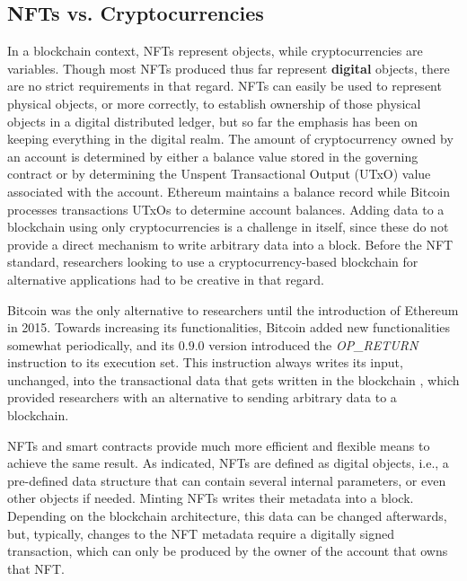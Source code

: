\documentclass[../3_VotingAndNFTs.tex]{subfiles}
\begin{document}
\subsection{NFTs vs. Cryptocurrencies}
In a blockchain context, NFTs represent objects, while cryptocurrencies are variables. Though most NFTs produced thus far represent \textbf{digital} objects, there are no strict requirements in that regard. NFTs can easily be used to represent physical objects, or more correctly, to establish ownership of those physical objects in a digital distributed ledger, but so far the emphasis has been on keeping everything in the digital realm. The amount of cryptocurrency owned by an account is determined by either a balance value stored in the governing contract or by determining the Unspent Transactional Output (UTxO) value associated with the account. Ethereum maintains a balance record while Bitcoin processes transactions UTxOs to determine account balances. Adding data to a blockchain using only cryptocurrencies is a challenge in itself, since these do not provide a direct mechanism to write arbitrary data into a block. Before the NFT standard, researchers looking to use a cryptocurrency-based blockchain for alternative applications had to be creative in that regard.
\par
Bitcoin was the only alternative to researchers until the introduction of Ethereum in 2015. Towards increasing its functionalities, Bitcoin added new functionalities somewhat periodically, and its $0.9.0$ version introduced the \textit{OP\_RETURN} instruction to its execution set. This instruction always writes its input, unchanged, into the transactional data that gets written in the blockchain \cite{Bartoletti2017}, which provided researchers with an alternative to sending arbitrary data to a blockchain.
\par
NFTs and smart contracts provide much more efficient and flexible means to achieve the same result. As indicated, NFTs are defined as digital objects, i.e., a pre-defined data structure that can contain several internal parameters, or even other objects if needed. Minting NFTs writes their metadata into a block. Depending on the blockchain architecture, this data can be changed afterwards, but, typically, changes to the NFT metadata require a digitally signed transaction, which can only be produced by the owner of the account that owns that NFT.
\end{document}
